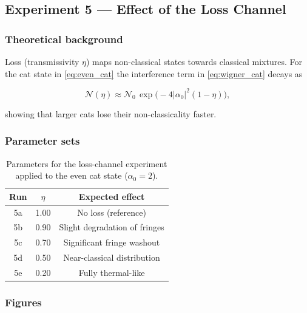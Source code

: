 \documentclass[12pt,a4paper]{article}
\begin{document}
\subsection{Experiment 5 — Effect of the Loss Channel}
\label{sec:exp5}

\subsubsection*{Theoretical background}

Loss (transmissivity $\eta$) maps non-classical states towards classical mixtures. For the cat state in \cref{eq:even_cat} the interference term in \cref{eq:wigner_cat} decays as

\begin{equation}
  \mathcal{N}(\eta) \approx \mathcal{N}_0\,\exp\!\bigl(-4|\alpha_0|^2(1-\eta)\bigr),
  \label{eq:negativity_loss}
\end{equation}

showing that larger cats lose their non-classicality faster.

\subsubsection*{Parameter sets}

\begin{table}[H]
  \centering
  \caption{Parameters for the loss-channel experiment applied to the even cat state ($\alpha_0=2$).}
  \label{tab:loss_params}
  \begin{tabular}{ccc}
    \toprule
    \textbf{Run} & $\eta$ & \textbf{Expected effect}\\
    \midrule
    5a & 1.00 & No loss (reference) \\
    5b & 0.90 & Slight degradation of fringes \\
    5c & 0.70 & Significant fringe washout \\
    5d & 0.50 & Near-classical distribution \\
    5e & 0.20 & Fully thermal-like \\
    \bottomrule
  \end{tabular}
\end{table}

\subsubsection*{Figures}
\end{document}
